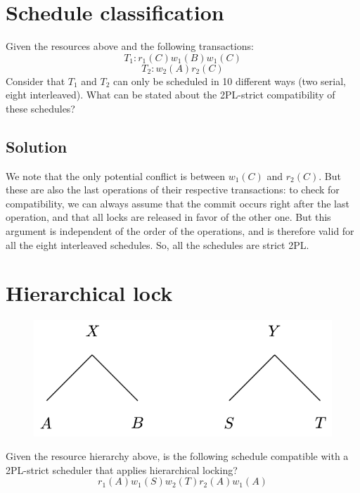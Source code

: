 \documentclass[12pt, a4paper]{report}
\begin{document}
    \section{Schedule classification}
        Given the resources above and the following transactions:
        \[T_1: r_1(C) w_1(B) w_1(C)\] 
        \[T_2: w_2(A) r_2(C)\]
        Consider that $T_1$ and $T_2$ can only be scheduled in 10 different ways (two serial, eight interleaved). What can be stated about 
        the 2PL-strict compatibility of these schedules? 
    \subsection*{Solution}
        We note that the only potential conflict is between $w_1(C)$ and $r_2(C)$. But these are also the last operations of their respective 
        transactions: to check for compatibility, we can always assume that the commit occurs right after the last operation, and that all 
        locks are released in favor of the other one. But this argument is independent of the order of the operations, and is therefore valid 
        for all the eight interleaved schedules. So, all the schedules are strict 2PL. 

    \newpage

    \section{Hierarchical lock}
        \begin{figure}[H]
            \centering
            \includegraphics[width=0.4\linewidth]{images/HL1.png}
        \end{figure}
        Given the resource hierarchy above, is the following schedule compatible with a 2PL-strict scheduler that applies hierarchical locking?
        \[r_1(A) w_1(S) w_2(T) r_2(A) w_1(A)\]
\end{document}
